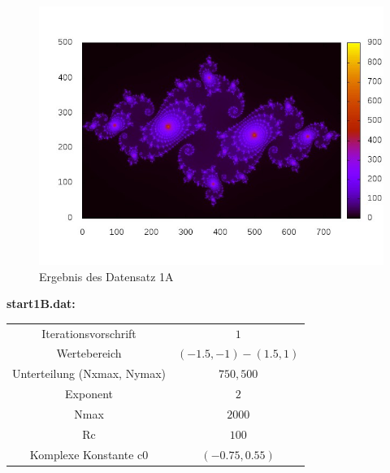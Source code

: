\documentclass{report}
\begin{document}
\begin{figure}[h]
    \centering
    \includegraphics[scale=0.7]{ergebnis1A}
    \caption{Ergebnis des Datensatz 1A}
    \label{fig:ergebnis1A} %
\end{figure}

\clearpage{}
\textbf{start1B.dat:}

\begin{center}
\begin{tabular}{c|c}
Iterationsvorschrift & $1$ \\
\cline{1-2}
Wertebereich & $(-1.5, -1) - (1.5, 1)$ \\
\cline{1-2}
Unterteilung (Nxmax, Nymax) & $750, 500$ \\
\cline{1-2}
Exponent & $2$  \\
\cline{1-2}
Nmax & $2000$ \\
\cline{1-2}
Rc & $100$ \\
\cline{1-2}
Komplexe Konstante c0 & $(-0.75, 0.55)$ \\
\cline{1-2}
\end{tabular}
\label{tab:resA2_2}
\end{center}
\end{document}
